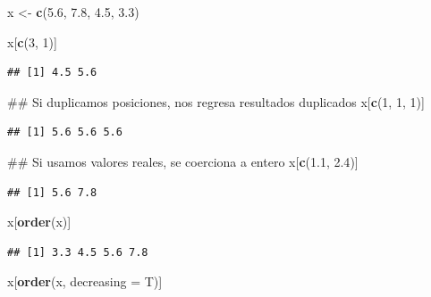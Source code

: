 \documentclass[]{article}
\newenvironment{Shaded}{\begin{snugshade}}{\end{snugshade}}
\newcommand{\KeywordTok}[1]{\textcolor[rgb]{0.13,0.29,0.53}{\textbf{{#1}}}}
\newcommand{\DataTypeTok}[1]{\textcolor[rgb]{0.13,0.29,0.53}{{#1}}}
\newcommand{\DecValTok}[1]{\textcolor[rgb]{0.00,0.00,0.81}{{#1}}}
\newcommand{\FloatTok}[1]{\textcolor[rgb]{0.00,0.00,0.81}{{#1}}}
\newcommand{\StringTok}[1]{\textcolor[rgb]{0.31,0.60,0.02}{{#1}}}
\newcommand{\NormalTok}[1]{{#1}}
\begin{document}
\begin{Shaded}
\begin{Highlighting}[]
\NormalTok{x <-}\StringTok{ }\KeywordTok{c}\NormalTok{(}\FloatTok{5.6}\NormalTok{, }\FloatTok{7.8}\NormalTok{, }\FloatTok{4.5}\NormalTok{, }\FloatTok{3.3}\NormalTok{)}

\NormalTok{x[}\KeywordTok{c}\NormalTok{(}\DecValTok{3}\NormalTok{, }\DecValTok{1}\NormalTok{)]}
\end{Highlighting}
\end{Shaded}

\begin{verbatim}
## [1] 4.5 5.6
\end{verbatim}

\begin{Shaded}
\begin{Highlighting}[]
\NormalTok{## Si duplicamos posiciones, nos regresa resultados duplicados}
\NormalTok{x[}\KeywordTok{c}\NormalTok{(}\DecValTok{1}\NormalTok{, }\DecValTok{1}\NormalTok{, }\DecValTok{1}\NormalTok{)]}
\end{Highlighting}
\end{Shaded}

\begin{verbatim}
## [1] 5.6 5.6 5.6
\end{verbatim}

\begin{Shaded}
\begin{Highlighting}[]
\NormalTok{## Si usamos valores reales, se coerciona a entero}
\NormalTok{x[}\KeywordTok{c}\NormalTok{(}\FloatTok{1.1}\NormalTok{, }\FloatTok{2.4}\NormalTok{)]}
\end{Highlighting}
\end{Shaded}

\begin{verbatim}
## [1] 5.6 7.8
\end{verbatim}

\begin{Shaded}
\begin{Highlighting}[]
\NormalTok{x[}\KeywordTok{order}\NormalTok{(x)]}
\end{Highlighting}
\end{Shaded}

\begin{verbatim}
## [1] 3.3 4.5 5.6 7.8
\end{verbatim}

\begin{Shaded}
\begin{Highlighting}[]
\NormalTok{x[}\KeywordTok{order}\NormalTok{(x, }\DataTypeTok{decreasing =} \NormalTok{T)]}
\end{Highlighting}
\end{Shaded}
\end{document}
